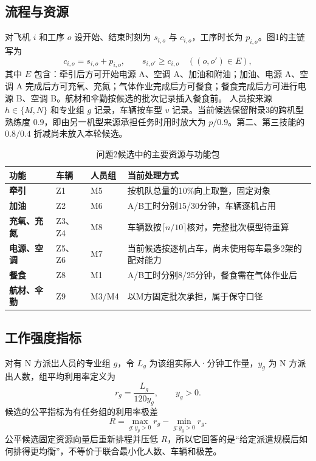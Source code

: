 \documentclass[UTF8,12pt,a4paper,fontset=none]{ctexart}
\begin{document}
\subsection{流程与资源}
对飞机 $i$ 和工序 $o$ 设开始、结束时刻为 $s_{i,o}$ 与 $c_{i,o}$，工序时长为 $p_{i,o}$。图1的主链写为
\[
 c_{i,o}=s_{i,o}+p_{i,o},\qquad s_{i,o'}\geq c_{i,o}\quad ((o,o')\in E),
\]
其中 $E$ 包含：牵引后方可开始电源 A、空调 A、加油和附油；加油、电源 A、空调 A 完成后方可充氧、充氮；气体作业完成后方可餐食；餐食完成后方可进行电源 B、空调 B。航材和伞勤按候选的批次记录插入餐食前。
人员按来源 $h\in\{M,N\}$ 和专业组 $g$ 记录，车辆按车型 $v$ 记录。当前候选保留附录3的跨机型熟练度 $0.9$，即由另一机型来源承担任务时用时放大为 $p/0.9$。第二、第三技能的 $0.8/0.4$ 折减尚未放入本轮候选。
\begin{table}[H]
\centering\small
\caption{问题2候选中的主要资源与功能包}
\label{tab:q2-resource}
\begin{tabularx}{\linewidth}{>{\bfseries}l l X l}
\toprule
功能 & 车辆 & 人员组 & 当前处理方式\\
\midrule
牵引 & Z1 & M5 & 按机队总量的10\%向上取整，固定对象\\
加油 & Z2 & M6 & A/B工时分别15/30分钟，车辆逐机占用\\
充氧、充氮 & Z3、Z4 & M8 & 车辆数按$\lceil n/10\rceil$核对，完整批次模型待重算\\
电源、空调 & Z5、Z6 & M7 & 当前候选按逐机占车，尚未使用每车最多2架的配对能力\\
餐食 & Z8 & M1 & A/B工时分别8/25分钟，餐食需在气体作业后\\
航材、伞勤 & Z9 & M3/M4 & 以M方固定批次承担，属于保守口径\\
\bottomrule
\end{tabularx}
\end{table}
\subsection{工作强度指标}
对有 N 方派出人员的专业组 $g$，令 $L_g$ 为该组实际人·分钟工作量，$y_g$ 为 N 方派出人数，组平均利用率定义为
\[
 r_g=\frac{L_g}{120y_g},\qquad y_g>0.
\]
候选的公平指标为有任务组的利用率极差
\[
 R=\max_{g:y_g>0}r_g-\min_{g:y_g>0}r_g.
\]
公平候选固定资源向量后重新排程并压低 $R$，所以它回答的是“给定派遣规模后如何排得更均衡”，不等价于联合最小化人数、车辆和极差。
\end{document}

